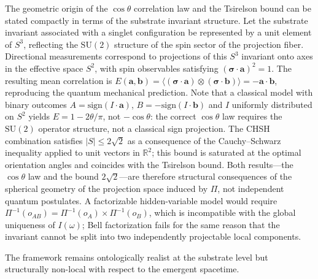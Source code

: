   The geometric origin of the $\cos\theta$ correlation law and the Tsirelson bound
  can be stated compactly in terms of the substrate invariant structure.
  Let the substrate invariant associated with a singlet configuration be represented by
  a unit element of $S^3$, reflecting the $\mathrm{SU}(2)$ structure of the spin sector
  of the projection fiber.
  Directional measurements correspond to projections of this $S^3$ invariant onto axes
  in the effective space $S^2$, with spin observables satisfying
  $(\boldsymbol{\sigma}\cdot\mathbf{a})^2 = 1$.
  The resulting mean correlation is
  $E(\mathbf{a}, \mathbf{b}) = \langle(\boldsymbol{\sigma}\cdot\mathbf{a})
  \otimes (\boldsymbol{\sigma}\cdot\mathbf{b})\rangle = -\mathbf{a}\cdot\mathbf{b}$,
  reproducing the quantum mechanical prediction.
  Note that a classical model with binary outcomes
  $A = \mathrm{sign}(I\cdot\mathbf{a})$, $B = -\mathrm{sign}(I\cdot\mathbf{b})$
  and $I$ uniformly distributed on $S^2$ yields $E = 1 - 2\theta/\pi$, not
  $-\cos\theta$: the correct $\cos\theta$ law requires the $\mathrm{SU}(2)$ operator
  structure, not a classical sign projection.
  The CHSH combination satisfies $|S| \leq 2\sqrt{2}$ as a consequence of the
  Cauchy--Schwarz inequality applied to unit vectors in $\mathbb{R}^2$; this bound
  is saturated at the optimal orientation angles and coincides with the Tsirelson
  bound.
  Both results---the $\cos\theta$ law and the bound $2\sqrt{2}$---are therefore
  structural consequences of the spherical geometry of the projection space induced
  by $\Pi$, not independent quantum postulates.
  A factorizable hidden-variable model would require $\Pi^{-1}(o_{AB}) =
\Pi^{-1}(o_A) \times \Pi^{-1}(o_B)$, which is incompatible with the global
  uniqueness of $I(\omega)$; Bell factorization fails for the same reason that the
  invariant cannot be split into two independently projectable local components.

  The framework remains ontologically realist at the substrate level but
  structurally non-local with respect to the emergent spacetime.
